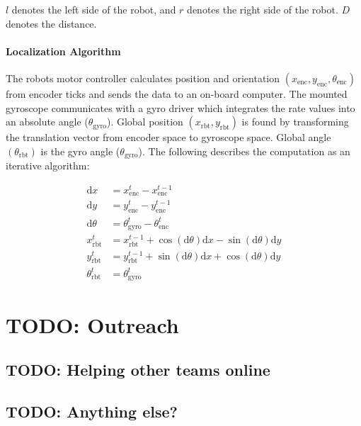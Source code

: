 \documentclass{article}
\begin{document}
$l$ denotes the left side of the robot, and $r$ denotes the right side of the robot. $D$ denotes the distance. 

\paragraph{Localization Algorithm}
The robots motor controller calculates position and orientation $(x_{\mathrm{enc}}, y_{\mathrm{enc}}, \theta_{\mathrm{enc}})$ from encoder ticks and sends the data to an on-board computer. The mounted gyroscope communicates with a gyro driver which integrates the rate values into an absolute angle ($\theta_{\mathrm{gyro}}$). Global position $(x_{\mathrm{rbt}}, y_{\mathrm{rbt}})$ is found by transforming the translation vector from encoder space to gyroscope space. Global angle $(\theta_{\mathrm{rbt}})$ is the gyro angle ($\theta_{\mathrm{gyro}}$). The following describes the computation as an iterative algorithm: 

\begin{center}
	\begin{align*}
		\mathrm{d}x&=x^{t}_{\mathrm{enc}}-x^{t-1}_{\mathrm{enc}} \\
		\mathrm{d}y&=y^{t}_{\mathrm{enc}}-y^{t-1}_{\mathrm{enc}} \\
		\mathrm{d}\theta&=\theta^t_{\mathrm{gyro}}-\theta^{t}_{\mathrm{enc}} \\
		x^t_{\mathrm{rbt}}&=x^{t-1}_{\mathrm{rbt}}+\cos(\mathrm{d}\theta)\mathrm{d}x-\sin(\mathrm{d}\theta)\mathrm{d}y \\
		y^t_{\mathrm{rbt}}&=y^{t-1}_{\mathrm{rbt}}+\sin(\mathrm{d}\theta)\mathrm{d}x+\cos(\mathrm{d}\theta)\mathrm{d}y \\
		\theta^t_{\mathrm{rbt}}&=\theta^t_{\mathrm{gyro}}
	\end{align*}
\end{center}

\newpage \section{TODO: Outreach}
\subsection{TODO: Helping other teams online}
\subsection{TODO: Anything else?}
\end{document}

